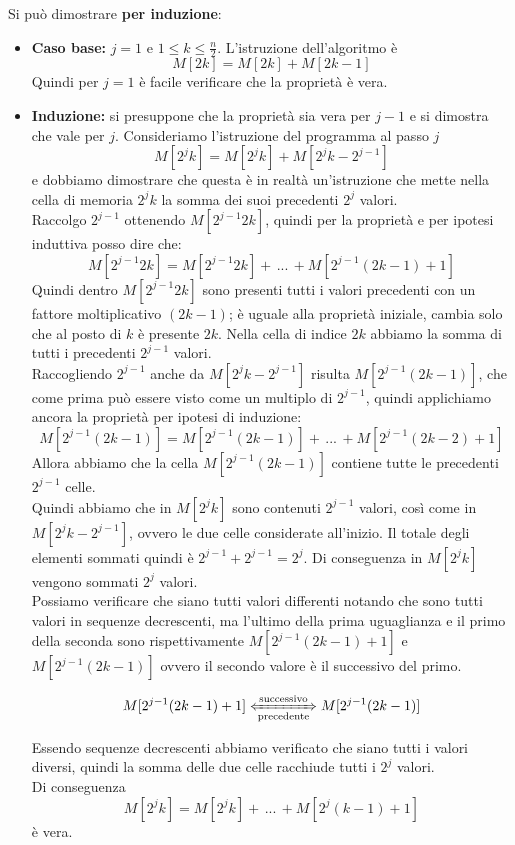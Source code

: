 Si può dimostrare \textbf{per induzione}: 
\begin{itemize}
	\item \textbf{Caso base:} $j=1$ e $1 \leq k \leq \frac{n}{2}$. L'istruzione dell'algoritmo è
	$$ M[2k] = M[2k] + M[2k-1] $$
	Quindi per $j=1$ è facile verificare che la proprietà è vera.\\
	
	\item \textbf{Induzione:} si presuppone che la proprietà sia vera per $j-1$ e si dimostra che vale per $j$. Consideriamo l'istruzione del programma al passo $j$
	$$ M[2^j k] = M[2^j k] + M[2^jk - 2^{j-1}]$$
	e dobbiamo dimostrare che questa è in realtà un'istruzione che mette nella cella di memoria $2^j k$ la somma dei suoi precedenti $2^j$ valori.\\
	
	Raccolgo $2^{j-1}$ ottenendo $M[2^{j-1} 2k]$, quindi per la proprietà e per ipotesi induttiva posso dire che:
	$$ M[2^{j-1} 2k] = M[2^{j-1} 2k] + \, ... \, + M[2^{j-1} (2k-1)+1]$$
	Quindi dentro $M[2^{j-1} 2k]$ sono presenti tutti i valori precedenti con un fattore moltiplicativo $(2k-1)$; è uguale alla proprietà iniziale, cambia solo che al posto di $k$ è presente $2k$. Nella cella di indice $2k$ abbiamo la somma di tutti i precedenti $2^{j-1}$ valori.\\
	
	Raccogliendo $2^{j-1}$ anche da $M[2^jk - 2^{j-1}]$ risulta $M[2^{j-1} (2k-1)]$, che come prima può essere visto come un multiplo di $2^{j-1}$, quindi applichiamo ancora la proprietà per ipotesi di induzione:
	$$ M[2^{j-1} (2k-1)] = M[2^{j-1} (2k-1)] + \, ... \, + M[2^{j-1} (2k-2)+1]$$
	Allora abbiamo che la cella $M[2^{j-1} (2k-1)]$ contiene tutte le precedenti $2^{j-1}$ celle.\\
	
	Quindi abbiamo che in $M[2^j k]$ sono contenuti $2^{j-1}$ valori, così come in $M[2^jk - 2^{j-1}]$, ovvero le due celle considerate all'inizio. Il totale degli elementi sommati quindi è $2^{j-1} + 2^{j-1} = 2^j$. Di conseguenza in $M[2^j k]$ vengono sommati $2^j$ valori.\\
	
	Possiamo verificare che siano tutti valori differenti notando che sono tutti valori in sequenze decrescenti, ma l'ultimo della prima uguaglianza e il primo della seconda sono rispettivamente $M[2^{j-1} (2k-1)+1]$ e $M[2^{j-1} (2k-1)]$ ovvero il secondo valore è il successivo del primo.
	
	$$M[2^{j-1} (2k-1)+1] \xLeftrightarrow[\text{precedente}]{\text{successivo}} M[2^{j-1} (2k-1)]$$
	
	Essendo sequenze decrescenti abbiamo verificato che siano tutti i valori diversi, quindi la somma delle due celle racchiude tutti i $2^j$ valori.\\
	
	Di conseguenza
	$$ M[2^j k] = M[2^j k] + \, ... \, + M[2^j (k-1) + 1] $$
	è vera.\\
	
\end{itemize}

